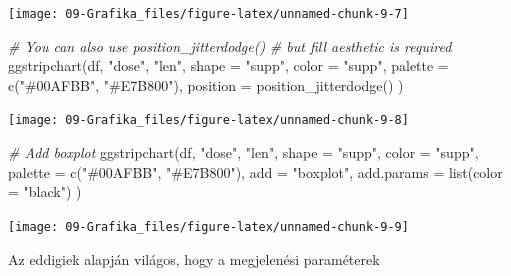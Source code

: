 \documentclass[
]{book}
\newenvironment{Shaded}{\begin{snugshade}}{\end{snugshade}}
\newcommand{\AttributeTok}[1]{\textcolor[rgb]{0.77,0.63,0.00}{#1}}
\newcommand{\CommentTok}[1]{\textcolor[rgb]{0.56,0.35,0.01}{\textit{#1}}}
\newcommand{\FunctionTok}[1]{\textcolor[rgb]{0.00,0.00,0.00}{#1}}
\newcommand{\NormalTok}[1]{#1}
\newcommand{\StringTok}[1]{\textcolor[rgb]{0.31,0.60,0.02}{#1}}
\begin{document}
\begin{center}\texttt{[image: 09-Grafika\_files/figure-latex/unnamed-chunk-9-7]} \end{center}

\begin{Shaded}
\begin{Highlighting}[]

\CommentTok{\# You can also use position\_jitterdodge()}
\CommentTok{\# but fill aesthetic is required}
\FunctionTok{ggstripchart}\NormalTok{(df, }\StringTok{"dose"}\NormalTok{, }\StringTok{"len"}\NormalTok{,  }\AttributeTok{shape =} \StringTok{"supp"}\NormalTok{,}
   \AttributeTok{color =} \StringTok{"supp"}\NormalTok{, }\AttributeTok{palette =} \FunctionTok{c}\NormalTok{(}\StringTok{"\#00AFBB"}\NormalTok{, }\StringTok{"\#E7B800"}\NormalTok{),}
   \AttributeTok{position =} \FunctionTok{position\_jitterdodge}\NormalTok{() )}
\end{Highlighting}
\end{Shaded}

\begin{center}\texttt{[image: 09-Grafika\_files/figure-latex/unnamed-chunk-9-8]} \end{center}

\begin{Shaded}
\begin{Highlighting}[]

\CommentTok{\# Add boxplot}
\FunctionTok{ggstripchart}\NormalTok{(df, }\StringTok{"dose"}\NormalTok{, }\StringTok{"len"}\NormalTok{, }\AttributeTok{shape =} \StringTok{"supp"}\NormalTok{,}
 \AttributeTok{color =} \StringTok{"supp"}\NormalTok{, }\AttributeTok{palette =} \FunctionTok{c}\NormalTok{(}\StringTok{"\#00AFBB"}\NormalTok{, }\StringTok{"\#E7B800"}\NormalTok{),}
 \AttributeTok{add =} \StringTok{"boxplot"}\NormalTok{, }\AttributeTok{add.params =} \FunctionTok{list}\NormalTok{(}\AttributeTok{color =} \StringTok{"black"}\NormalTok{) )}
\end{Highlighting}
\end{Shaded}

\begin{center}\texttt{[image: 09-Grafika\_files/figure-latex/unnamed-chunk-9-9]} \end{center}

Az eddigiek alapján világos, hogy a megjelenési paraméterek
\end{document}
